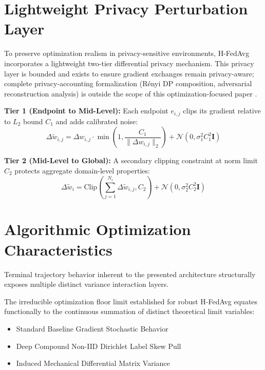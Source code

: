 \documentclass[conference]{IEEEtran}
\begin{document}
\section{Lightweight Privacy Perturbation Layer}

To preserve optimization realism in privacy-sensitive environments, H-FedAvg incorporates a lightweight two-tier differential privacy mechanism. This privacy layer is bounded and exists to ensure gradient exchanges remain privacy-aware; complete privacy-accounting formalization (R\'enyi DP composition, adversarial reconstruction analysis) is outside the scope of this optimization-focused paper \cite{b34}.

\textbf{Tier 1 (Endpoint to Mid-Level):} 
Each endpoint $e_{i,j}$ clips its gradient relative to $L_2$ bound $C_{1}$ and adds calibrated noise:
\begin{equation}
\Delta \tilde{w}_{i,j} = \Delta w_{i,j} \cdot \min\left(1, \frac{C_1}{\|\Delta w_{i,j}\|_2}\right) + \mathcal{N}(0, \sigma_1^2 C_1^2 \mathbf{I})
\end{equation}

\textbf{Tier 2 (Mid-Level to Global):} 
A secondary clipping constraint at norm limit $C_2$ protects aggregate domain-level properties:
\begin{equation}
\Delta \tilde{w}_i = \text{Clip}\left(\sum_{j=1}^{N_i} \Delta \tilde{w}_{i,j}, C_2\right) + \mathcal{N}(0, \sigma_2^2 C_2^2 \mathbf{I})
\end{equation}

\section{Algorithmic Optimization Characteristics}

Terminal trajectory behavior inherent to the presented architecture structurally exposes multiple distinct variance interaction layers.

The irreducible optimization floor limit established for robust H-FedAvg equates functionally to the continuous summation of distinct theoretical limit variables:
\begin{itemize}
    \item Standard Baseline Gradient Stochastic Behavior
    \item Deep Compound Non-IID Dirichlet Label Skew Pull
    \item Induced Mechanical Differential Matrix Variance
\end{itemize}
\end{document}
